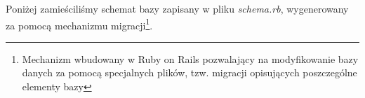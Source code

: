 Poniżej zamieściliśmy schemat bazy zapisany w pliku \emph{schema.rb}, wygenerowany za pomocą mechanizmu migracji\footnote{Mechanizm wbudowany w Ruby on Rails pozwalający na modyfikowanie bazy danych za pomocą specjalnych plików, tzw. migracji opisujących poszczególne elementy bazy\cite{rails4_way}}.

\begin{code}
  
\end{code}
